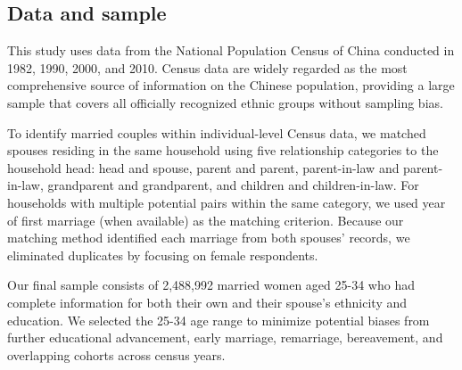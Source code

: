 
\subsection{Data and sample}

This study uses data from the National Population Census of China conducted in
1982, 1990, 2000, and 2010.
Census data are widely regarded as the most comprehensive source of information
on the Chinese population, providing a large sample that covers all officially
recognized ethnic groups without sampling bias.

To identify married couples within individual-level Census data, we matched
spouses residing in the same household using five relationship categories to
the household head: head and spouse, parent and parent, parent-in-law and
parent-in-law, grandparent and grandparent, and children and children-in-law.
For households with multiple potential pairs within the same category, we used
year of first marriage (when available) as the matching criterion.
Because our matching method identified each marriage from both spouses' records,
we eliminated duplicates by focusing on female respondents.

Our final sample consists of 2,488,992 married women aged 25-34 who had
complete information for both their own and their spouse's ethnicity and
education.
We selected the 25-34 age range to minimize potential biases from
further educational advancement, early marriage, remarriage, bereavement, and
overlapping cohorts across census years.